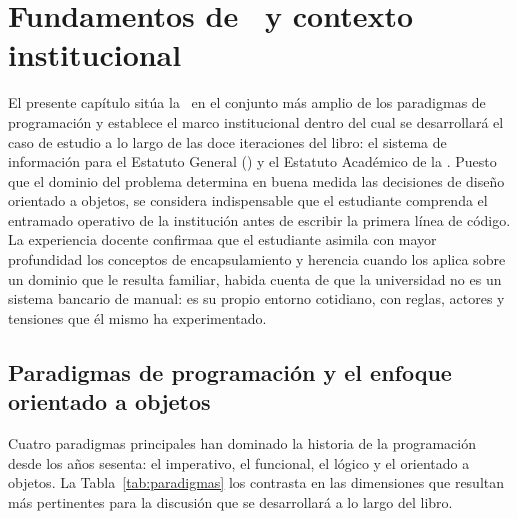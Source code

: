 
\chapter{Fundamentos de \poo\ y contexto institucional}
\label{cap:fundamentos}

\noindent
El presente capítulo sitúa la \poo\ en el conjunto más amplio de los
paradigmas de programación y establece el marco institucional dentro
del cual se desarrollará el caso de estudio a lo largo de las doce
iteraciones del libro: el sistema de información para el Estatuto General
(\acuerdo) y el Estatuto Académico de la \ud.
Puesto que el dominio del problema determina en buena medida las
decisiones de diseño orientado a objetos, se considera indispensable
que el estudiante comprenda el entramado operativo de la institución
antes de escribir la primera línea de código.
La experiencia docente confirmaa que el estudiante asimila con mayor
profundidad los conceptos de encapsulamiento y herencia cuando los aplica
sobre un dominio que le resulta familiar, habida cuenta de que la universidad
no es un sistema bancario de manual: es su propio entorno cotidiano,
con reglas, actores y tensiones que él mismo ha experimentado.
\section{Paradigmas de programación y el enfoque orientado a objetos}
\label{sec:paradigmas}

Cuatro paradigmas principales han dominado la historia de la programación
desde los años sesenta: el imperativo, el funcional, el lógico y el orientado
a objetos. La Tabla~\ref{tab:paradigmas} los contrasta en las dimensiones
que resultan más pertinentes para la discusión que se desarrollará a lo
largo del libro.

